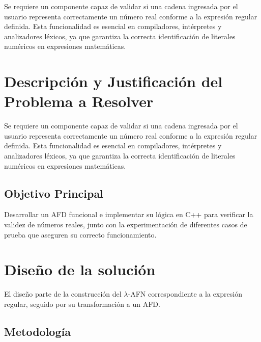 \documentclass{article}
\begin{document}
Se requiere un componente capaz de validar si una cadena ingresada por el usuario representa correctamente un número real conforme a la expresión regular definida. Esta funcionalidad es esencial en compiladores, intérpretes y analizadores léxicos, ya que garantiza la correcta identificación de literales numéricos en expresiones matemáticas.





\section{Descripción y Justificación del Problema a Resolver}\label{sec:descr}

Se requiere un componente capaz de validar si una cadena ingresada por el usuario representa correctamente un número real conforme a la expresión regular definida. Esta funcionalidad es esencial en compiladores, intérpretes y analizadores léxicos, ya que garantiza la correcta identificación de literales numéricos en expresiones matemáticas.

\subsection{Objetivo Principal}

Desarrollar un AFD funcional e implementar su lógica en C++ para verificar la validez de números reales, junto con la experimentación de diferentes casos de prueba que aseguren su correcto funcionamiento.

\section{Diseño de la solución}\label{sec:dis}
El diseño parte de la construcción del $\lambda$-AFN correspondiente a la expresión regular, seguido por su transformación a un AFD.

\subsection{Metodología}
\end{document}
